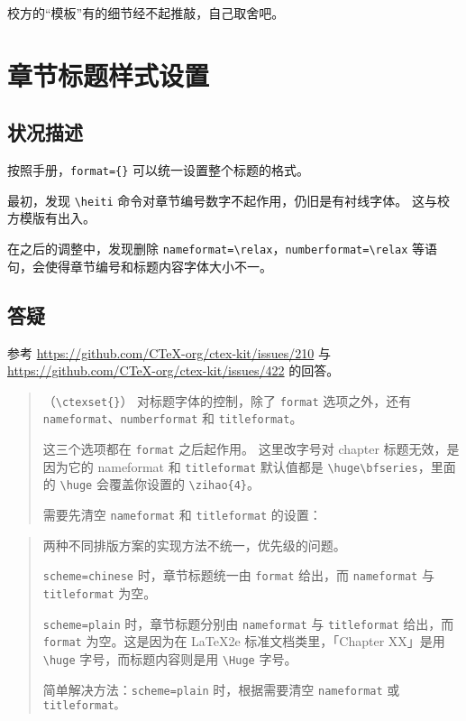 \documentclass[../Main/thesis.tex]{subfiles}
\begin{document}
校方的``模板''有的细节经不起推敲，自己取舍吧。

\section{章节标题样式设置}

\subsection{状况描述}

按照手册，\texttt{format=\{\}} 可以统一设置整个标题的格式。

最初，发现 \texttt{\textbackslash{}heiti}
命令对章节编号数字不起作用，仍旧是有衬线字体。 这与校方模版有出入。

在之后的调整中，发现删除
\texttt{nameformat=\textbackslash{}relax}，\texttt{numberformat=\textbackslash{}relax}
等语句，会使得章节编号和标题内容字体大小不一。

\subsection{答疑}

参考 \url{https://github.com/CTeX-org/ctex-kit/issues/210} 与
\url{https://github.com/CTeX-org/ctex-kit/issues/422} 的回答。

\begin{quote}
（\texttt{\textbackslash{}ctexset\{\}}） 对标题字体的控制，除了
\texttt{format} 选项之外，还有
\texttt{nameformat}、\texttt{numberformat} 和 \texttt{titleformat}。

这三个选项都在 \texttt{format} 之后起作用。 这里改字号对 chapter
标题无效，是因为它的 nameformat 和 \texttt{titleformat} 默认值都是
\texttt{\textbackslash{}huge\textbackslash{}bfseries}，里面的
\texttt{\textbackslash{}huge} 会覆盖你设置的
\texttt{\textbackslash{}zihao\{4\}}。

需要先清空 \texttt{nameformat} 和 \texttt{titleformat} 的设置：
\end{quote}

\begin{quote}
两种不同排版方案的实现方法不统一，优先级的问题。

\texttt{scheme=chinese} 时，章节标题统一由 \texttt{format} 给出，而
\texttt{nameformat} 与 \texttt{titleformat} 为空。

\texttt{scheme=plain} 时，章节标题分别由 \texttt{nameformat} 与
\texttt{titleformat} 给出，而 \texttt{format} 为空。这是因为在 LaTeX2e
标准文档类里，「Chapter XX」是用 \texttt{\textbackslash{}huge}
字号，而标题内容则是用 \texttt{\textbackslash{}Huge} 字号。

简单解决方法：\texttt{scheme=plain} 时，根据需要清空 \texttt{nameformat}
或 \texttt{titleformat。}
\end{quote}
\end{document}
